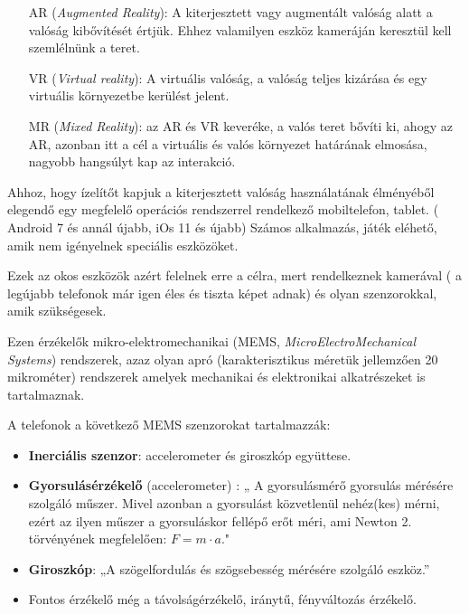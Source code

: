 
\begin{itemize}
\item[AR] (\textit{Augmented Reality}):
A kiterjesztett vagy augmentált valóság alatt a valóság kibővítését értjük. Ehhez valamilyen eszköz kameráján keresztül kell szemlélnünk a teret.
\item[VR] (\textit{Virtual reality}): A virtuális valóság, a valóság teljes kizárása és egy virtuális környezetbe kerülést jelent. 
\item[MR] (\textit{Mixed Reality}): az AR és VR keveréke, a valós teret bővíti ki, ahogy az AR, azonban itt a cél a virtuális és valós környezet határának elmosása, nagyobb hangsúlyt kap az interakció. 
\end{itemize}



Ahhoz, hogy ízelítőt kapjuk a kiterjesztett valóság használatának élményéből elegendő egy megfelelő operációs rendszerrel rendelkező mobiltelefon, tablet. ( Android 7 és annál újabb, iOs 11 és újabb)
Számos alkalmazás, játék eléhető, amik nem igényelnek speciális eszközöket. 

Ezek az okos eszközök azért felelnek erre a célra, mert rendelkeznek kamerával ( a legújabb telefonok már igen éles és tiszta képet adnak) és olyan szenzorokkal, amik  szükségesek.

Ezen érzékelők  mikro-elektromechanikai (MEMS, \textit{MicroElectroMechanical Systems}) 
rendszerek, azaz olyan apró (karakterisztikus méretük jellemzően 20 mikrométer) rendszerek amelyek mechanikai és elektronikai alkatrészeket is tartalmaznak.\cite{mems}

A telefonok a következő MEMS szenzorokat tartalmazzák:
\begin{itemize}
\item {\bf Inerciális szenzor}: accelerometer és giroszkóp együttese.
\item {\bf Gyorsulásérzékelő} (accelerometer) : „ A gyorsulásmérő gyorsulás mérésére szolgáló műszer. Mivel azonban a gyorsulást közvetlenül nehéz(kes) mérni, ezért az ilyen műszer a gyorsuláskor fellépő erőt méri, ami Newton 2. törvényének megfelelően: $F = m\cdot a.$"\cite{gyorsulas}

\item {\bf Giroszkóp}: „A szögelfordulás és szögsebesség mérésére szolgáló eszköz.”\cite{giroszkop}
\item Fontos érzékelő még a távolságérzékelő, iránytű, fényváltozás érzékelő.
\end{itemize}

